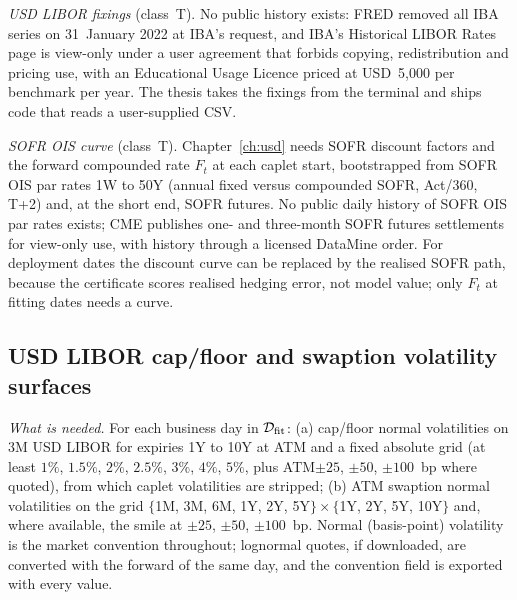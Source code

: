 \emph{USD LIBOR fixings} (class~T). No public history exists: FRED removed all IBA series on 31~January 2022 at IBA's request, and IBA's Historical LIBOR Rates page is view-only under a user agreement that forbids copying, redistribution and pricing use, with an Educational Usage Licence priced at USD~5{,}000 per benchmark per year. The thesis takes the fixings from the terminal and ships code that reads a user-supplied CSV.

\emph{SOFR OIS curve} (class~T). Chapter~\ref{ch:usd} needs SOFR discount factors and the forward compounded rate $F_t$ at each caplet start, bootstrapped from SOFR OIS par rates 1W to 50Y (annual fixed versus compounded SOFR, Act/360, T+2) and, at the short end, SOFR futures. No public daily history of SOFR OIS par rates exists; CME publishes one- and three-month SOFR futures settlements for view-only use, with history through a licensed DataMine order. For deployment dates the discount curve can be replaced by the realised SOFR path, because the certificate scores realised hedging error, not model value; only $F_t$ at fitting dates needs a curve.



\subsection{USD LIBOR cap/floor and swaption volatility surfaces}\label{appC:usd-libor-vol}

\emph{What is needed.} For each business day in $\mathcal D_{\mathrm{fit}}$: (a) cap/floor normal volatilities on 3M USD LIBOR for expiries 1Y to 10Y at ATM and a fixed absolute grid (at least $1\%$, $1.5\%$, $2\%$, $2.5\%$, $3\%$, $4\%$, $5\%$, plus ATM$\pm25$, $\pm50$, $\pm100$~bp where quoted), from which caplet volatilities are stripped; (b) ATM swaption normal volatilities on the grid $\{$1M, 3M, 6M, 1Y, 2Y, 5Y$\}\times\{$1Y, 2Y, 5Y, 10Y$\}$ and, where available, the smile at $\pm25$, $\pm50$, $\pm100$~bp. Normal (basis-point) volatility is the market convention throughout; lognormal quotes, if downloaded, are converted with the forward of the same day, and the convention field is exported with every value.

